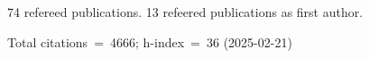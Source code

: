74 refereed publications. 13 refeered publications as first author.

Total citations~=~4666; h-index~=~36 (2025-02-21)